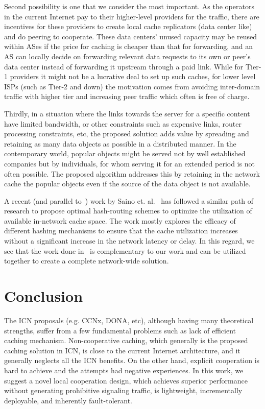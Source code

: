 \documentclass[article]{elsarticle}
\begin{document}
Second possibility is one that we consider the most important. As the operators in the current Internet pay to their higher-level providers for the traffic, there are incentives for these providers to create local cache replicators (data center like) and do peering to cooperate. These data centers' unused capacity may be reused within ASes if the price for caching is cheaper than that for forwarding, and an AS can locally decide on forwarding relevant data requests to its own or peer's data center instead of forwarding it upstream through a paid link. While for Tier-1 providers it might not be a lucrative deal to set up such caches, for lower level ISPs (such as Tier-2 and down) the motivation comes from avoiding inter-domain traffic with higher tier and increasing peer traffic which often is free of charge.

Thirdly, in a situation where the links towards the server for a specific content have limited bandwidth, or other constraints such as expensive links, router processing constraints, etc, the proposed solution adds value by spreading and retaining as many data objects as possible in a distributed manner. In the contemporary world, popular objects might be served not by well established companies but by individuals, for whom serving it for an extended period is not often possible. The proposed algorithm addresses this by retaining in the network cache the popular objects even if the source of the data object is not available.

A recent (and parallel to~\cite{myinfocom}) work by Saino et. al.~\cite{saino2013hash} has followed a similar path of research to propose optimal hash-routing schemes to optimize the utilization of available in-network cache space. The work mostly explores the efficacy of different hashing mechanisms to ensure that the cache utilization increases without a significant increase in the network latency or delay. In this regard, we see that the work done in~\cite{saino2013hash} is complementary to our work and can be utilized together to create a complete network-wide solution. 

\section{Conclusion}
\label{sec:concl}
The ICN proposals (e.g. CCNx, DONA, etc), although having many theoretical strengths, suffer from a few fundamental problems such as lack of efficient caching mechanism. Non-cooperative caching, which generally is the proposed caching solution in ICN, is close to the current Internet architecture, and it generally neglects all the ICN benefits. On the other hand, explicit cooperation is hard to achieve and the attempts had negative experiences. In this work, we suggest a novel local cooperation design, which achieves superior performance without generating prohibitive signaling traffic, is lightweight, incrementally deployable, and inherently fault-tolerant.
\end{document}
